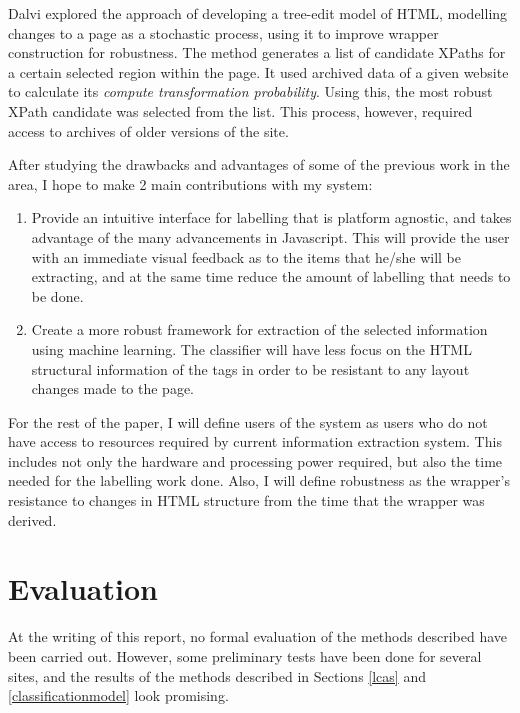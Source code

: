 \documentclass[a4paper,12pt]{article}
\begin{document}
	Dalvi explored the approach of developing a tree-edit model of HTML, modelling changes to a page as a stochastic process, using it to improve wrapper construction for robustness\cite{Dalvi2009}. The method generates a list of candidate XPaths for a certain selected region within the page. It used archived data of a given website to calculate its \textit{compute transformation probability}. Using this, the most robust XPath candidate was selected from the list. This process, however, required access to archives of older versions of the site.

	After studying the drawbacks and advantages of some of the previous work in the area, I hope to make 2 main contributions with my system:
	\begin{enumerate}
		\item Provide an intuitive interface for labelling that is platform agnostic, and takes advantage of the many advancements in Javascript. This will provide the user with an immediate visual feedback as to the items that he/she will be extracting, and at the same time reduce the amount of labelling that needs to be done.
		\item Create a more robust framework for extraction of the selected information using machine learning. The classifier will have less focus on the HTML structural information of the tags in order to be resistant to any layout changes made to the page.
	\end{enumerate}
	For the rest of the paper, I will define users of the system as users who do not have access to resources required by current information extraction system. This includes not only the hardware and processing power required, but also the time needed for the labelling work done. Also, I will define robustness as the wrapper's resistance to changes in HTML structure from the time that the wrapper was derived.
	

\section{Evaluation}
	At the writing of this report, no formal evaluation of the methods described have been carried out. However, some preliminary tests have been done for several sites, and the results of the methods described in Sections \ref{lcas} and \ref{classificationmodel} look promising.
	
\end{document}
